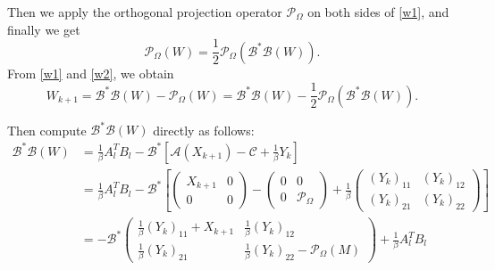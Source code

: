 \documentclass{article}
\begin{document}
{Then we apply the orthogonal projection operator $\mathcal{P}_\Omega$ on both sides of \eqref{w1}, and finally we get
\begin{equation}
	\label{w2}
	\mathcal{P}_\Omega(W) = \frac{1}{2} \mathcal{P}_\Omega(\mathcal{B}^*\mathcal{B}(W)).
\end{equation}
From \eqref{w1} and \eqref{w2}, we obtain
\begin{equation*}
	W_{k+1} = \mathcal{B}^*\mathcal{B}(W) - \mathcal{P}_\Omega(W) = \mathcal{B}^*\mathcal{B}(W) -\frac{1}{2} \mathcal{P}_\Omega(\mathcal{B}^*\mathcal{B}(W)). 
\end{equation*}

Then compute $	\mathcal{B}^*\mathcal{B}(W)$ directly as follows:
\begin{align*}
	\mathcal{B}^*\mathcal{B}(W) &=  \frac{1}{\beta}A_l^TB_l - \mathcal{B}^*\left[ \mathcal{A} (X_{k+1} ) - \mathcal{C} +\frac{1}{\beta} Y_k \right] \\
	& = \frac{1}{\beta}A_l^TB_l - \mathcal{B}^*\left[\begin{pmatrix}
		X_{k+1} & 0 \\
		0 & 0
	\end{pmatrix} - 
	\begin{pmatrix}
		0 & 0 \\
		0 & \mathcal{P}_\Omega
	\end{pmatrix} + \frac{1}{\beta} 
	\begin{pmatrix}
		(Y_k)_{11} & (Y_k)_{12} \\
		(Y_k)_{21} & (Y_k)_{22}
	\end{pmatrix}\right] \\
	& = -\mathcal{B}^*\begin{pmatrix}
		\frac{1}{\beta} (Y_k)_{11} + X_{k+1} & \frac{1}{\beta} (Y_k)_{12} \\
		\frac{1}{\beta} (Y_k)_{21} & \frac{1}{\beta} (Y_k)_{22} - \mathcal{P}_\Omega(M)
	\end{pmatrix} + \frac{1}{\beta}A_l^TB_l
\end{align*}

}
\end{document}
